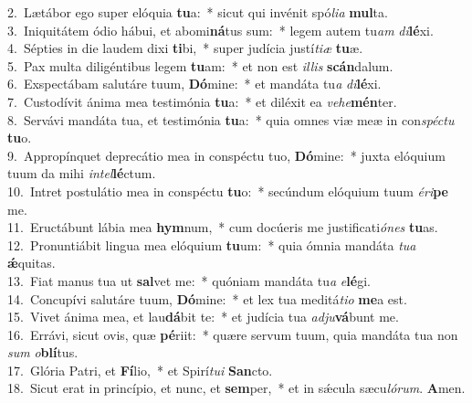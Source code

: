 {2.~}Lætábor ego super elóquia \textbf{tu}a:~* sicut qui invénit spó\textit{li}\textit{a} \textbf{mul}ta.\\
{3.~}Iniquitátem ódio hábui, et abomi\textbf{ná}tus sum:~* legem autem tu\textit{am} \textit{di}\textbf{lé}xi.\\
{4.~}Sépties in die laudem dixi \textbf{ti}bi,~* super judícia justí\textit{ti}\textit{æ} \textbf{tu}æ.\\
{5.~}Pax multa diligéntibus legem \textbf{tu}am:~* et non est \textit{il}\textit{lis} \textbf{scán}dalum.\\
{6.~}Exspectábam salutáre tuum, \textbf{Dó}mine:~* et mandáta tu\textit{a} \textit{di}\textbf{lé}xi.\\
{7.~}Custodívit ánima mea testimónia \textbf{tu}a:~* et diléxit ea \textit{ve}\textit{he}\textbf{mén}ter.\\
{8.~}Servávi mandáta tua, et testimónia \textbf{tu}a:~* quia omnes viæ meæ in con\textit{spé}\textit{ctu} \textbf{tu}o.\\
{9.~}Appropínquet deprecátio mea in conspéctu tuo, \textbf{Dó}mine:~* juxta elóquium tuum da mihi \textit{in}\textit{tel}\textbf{lé}ctum.\\
{10.~}Intret postulátio mea in conspéctu \textbf{tu}o:~* secúndum elóquium tuum \textit{é}\textit{ri}\textbf{pe} me.\\
{11.~}Eructábunt lábia mea \textbf{hym}num,~* cum docúeris me justificati\textit{ó}\textit{nes} \textbf{tu}as.\\
{12.~}Pronuntiábit lingua mea elóquium \textbf{tu}um:~* quia ómnia mandáta \textit{tu}\textit{a} \textbf{ǽ}quitas.\\
{13.~}Fiat manus tua ut \textbf{sal}vet me:~* quóniam mandáta tu\textit{a} \textit{e}\textbf{lé}gi.\\
{14.~}Concupívi salutáre tuum, \textbf{Dó}mine:~* et lex tua meditá\textit{ti}\textit{o} \textbf{me}a est.\\
{15.~}Vivet ánima mea, et lau\textbf{dá}bit te:~* et judícia tua \textit{ad}\textit{ju}\textbf{vá}bunt me.\\
{16.~}Errávi, sicut ovis, quæ \textbf{pé}riit:~* quære servum tuum, quia mandáta tua non \textit{sum} \textit{o}\textbf{blí}tus.\\
{17.~}Glória Patri, et \textbf{Fí}lio,~* et Spirí\textit{tu}\textit{i} \textbf{San}cto.\\
{18.~}Sicut erat in princípio, et nunc, et \textbf{sem}per,~* et in sǽcula sæcu\textit{ló}\textit{rum}. \textbf{A}men.\\
